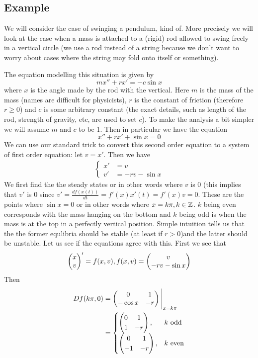 \subsection{Example}
We will consider the case of swinging a pendulum, kind of. More precisely we will look at the case when a mass is attached to a (rigid) rod allowed to swing freely in a vertical circle (we use a rod instead of a string because we don't want to worry about cases where the string may fold onto itself or something). 


The equation modelling this situation is given by
\begin{equation*}
    mx'' + rx' = -c \sin x
\end{equation*}
where $x$ is the angle made by the rod with the vertical. Here $m$ is the mass of the mass (names are difficult for physicists), $r$ is the constant of friction (therefore $r \geq 0$) and $c$ is some arbitrary constant (the exact details, such as length of the rod, strength of gravity, etc, are used to set $c$). To make the analysis a bit simpler we will assume $m$ and $c$ to be 1. Then in particular we have the equation
\begin{equation}
    x'' + rx' + \sin x = 0
\end{equation}
We can use our standard trick to convert this second order equation to a system of first order equation: let $v = x'$. Then we have
\begin{align*}
    \begin{cases}
    x' &= v\\
    v' &= -rv - \sin x
    \end{cases}
\end{align*}
We first find the the steady states or in other words where $v$ is 0 (this implies that $v'$ is 0 since $v' = \frac{df(x(t))}{dt} = f'(x) x'(t) = f'(x) v = 0$. These are the points where $\sin x = 0$ or in other words where $x = k\pi, k \in \mathbb{Z}$. $k$ being even corresponds with the mass hanging on the bottom and $k$ being odd is when the mass is at the top in a perfectly vertical position. Simple intuition tells us that the the former equlibria should be stable (at least if $r > 0$)and the latter should be unstable. Let us see if the equations agree with this. First we see that 
$$ \begin{pmatrix} x\\v \end{pmatrix}' = f(x,v), f(x, v) = \begin{pmatrix} v\\-rv - \sin x \end{pmatrix}$$
Then
\begin{align*}
    Df(k\pi, 0) &= \begin{pmatrix} 0 & 1\\-\cos x & -r \end{pmatrix}\Bigg|_{x = k\pi}\\
    &= 
    \begin{cases}
    \begin{pmatrix} 0 & 1\\1 & -r \end{pmatrix}, &k \text{ odd}\\
    \begin{pmatrix} 0 & 1\\-1 & -r \end{pmatrix}, &k \text{ even}
    \end{cases}
\end{align*}

